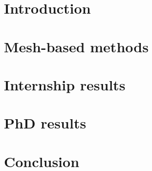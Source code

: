 \documentclass[compress,10pt,xcolor={table,dvipsnames},t]{beamer}
\begin{document}
	
	\section{Introduction}
	
	
	\section{Mesh-based methods}
	
	
	
	\section{Internship results}
	
	
	\section{PhD results}
	
	
	\section{Conclusion} %
	
\end{document}
